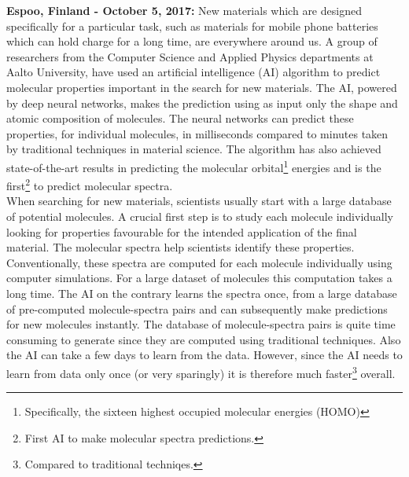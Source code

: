 \documentclass[a4paper]{article}
\title{\justify\fontsize{20}{20}\selectfont{AI developed by a group of researchers at Aalto University could significantly speed up the search for new materials.}}
\begin{document}
\date{}
\maketitle
%     

\noindent \textbf{Espoo, Finland - October 5, 2017:} New materials which are designed specifically for a particular task, such as materials for mobile phone batteries which can hold charge for a long time, are everywhere around us. A group of researchers from the Computer Science and Applied Physics departments at Aalto University, have used an artificial intelligence (AI) algorithm to predict molecular properties important in the search for new materials. The AI, powered by deep neural networks, makes the prediction using as input only the shape and atomic composition of molecules. The neural networks can predict these properties, for individual molecules, in milliseconds compared to minutes taken by traditional techniques in material science. The algorithm has also achieved state-of-the-art results in predicting the molecular orbital\footnote{Specifically, the sixteen highest occupied molecular energies (HOMO)} energies and is the first\footnote{First AI to make molecular spectra predictions.} to predict molecular spectra.\\

When searching for new materials, scientists usually start with a large database of potential molecules. A crucial first step is to study each molecule individually looking for properties favourable for the intended application of the final material. The molecular spectra help scientists identify these properties. 
Conventionally, these spectra are computed for each molecule individually using computer simulations. For a large dataset of molecules this computation takes a long time.
The AI on the contrary learns the spectra once, from a large database of pre-computed molecule-spectra pairs and can subsequently make predictions for new molecules instantly.
The database of molecule-spectra pairs is quite time consuming to generate since they are computed using traditional techniques. Also the AI can take a few days to learn from the data. However, since the AI needs to learn from data only once (or very sparingly) it is therefore much faster\footnote{Compared to traditional techniqes.} overall.\\
\end{document}
